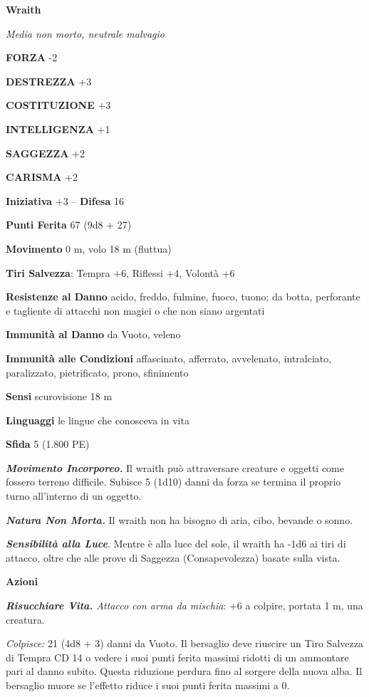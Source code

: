 \begin{multicols}{2}
\medskip{}\textbf{Wraith}

\emph{Media non morto, neutrale malvagio}

\textbf{FORZA} -2

\textbf{DESTREZZA} +3

\textbf{COSTITUZIONE} +3

\textbf{INTELLIGENZA} +1

\textbf{SAGGEZZA} +2

\textbf{CARISMA} +2

\textbf{Iniziativa} +3 -- \textbf{Difesa} 16

\textbf{Punti Ferita} 67 (9d8 + 27)

\textbf{Movimento} 0 m, volo 18 m (fluttua)

\textbf{Tiri Salvezza}: Tempra +6, Riflessi +4, Volontà +6

\textbf{Resistenze al Danno} acido, freddo, fulmine, fuoco, tuono; da botta, perforante e tagliente di attacchi non magici o che non siano argentati

\textbf{Immunità al Danno} da Vuoto, veleno

\textbf{Immunità alle Condizioni} affascinato, afferrato, avvelenato, intralciato, paralizzato, pietrificato, prono, sfinimento

\textbf{Sensi} scurovisione 18 m 

\textbf{Linguaggi} le lingue
che conosceva in vita 

\textbf{Sfida} 5 (1.800 PE)

\emph{\textbf{Movimento Incorporeo.}} Il wraith può attraversare creature e oggetti come fossero terreno difficile. Subisce 5 (1d10) danni da forza se termina il proprio turno all'interno di un oggetto.

\emph{\textbf{Natura Non Morta.}} Il wraith non ha bisogno di aria, cibo, bevande o sonno.

\emph{\textbf{Sensibilità alla Luce}}. Mentre è alla luce del sole, il wraith ha -1d6 ai tiri di attacco, oltre che alle prove di Saggezza (Consapevolezza) basate sulla vista.

\textbf{Azioni}

\emph{\textbf{Risucchiare Vita.} Attacco con arma da mischia}: +6 a colpire, portata 1 m, una creatura.

\emph{Colpisce:} 21 (4d8 + 3) danni da Vuoto. Il bersaglio deve riuscire un Tiro Salvezza di Tempra CD 14 o vedere i suoi punti ferita massimi ridotti di un ammontare pari al danno subito. Questa riduzione perdura fino al sorgere della nuova alba. Il bersaglio muore se l'effetto riduce i suoi punti ferita massimi a 0.


\end{multicols}

